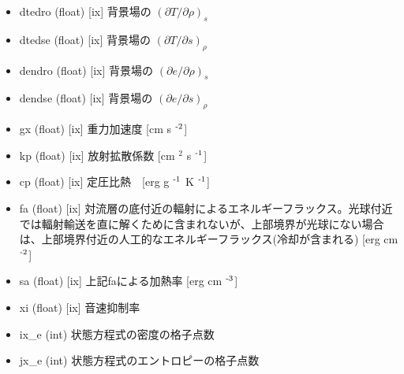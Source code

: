 \documentclass[letterpaper,10pt,dvipdfmx,report]{sphinxmanual}
\begin{document}
\begin{itemize}
\item {} 
\sphinxAtStartPar
dtedro (float) {[}ix{]} \sphinxhyphen{}\sphinxhyphen{} 背景場の \((\partial T/\partial \rho)_s\)

\item {} 
\sphinxAtStartPar
dtedse (float) {[}ix{]} \sphinxhyphen{}\sphinxhyphen{} 背景場の \((\partial T/\partial s)_\rho\)

\item {} 
\sphinxAtStartPar
dendro (float) {[}ix{]} \sphinxhyphen{}\sphinxhyphen{} 背景場の \((\partial e/\partial \rho)_s\)

\item {} 
\sphinxAtStartPar
dendse (float) {[}ix{]} \sphinxhyphen{}\sphinxhyphen{} 背景場の \((\partial e/\partial s)_\rho\)

\item {} 
\sphinxAtStartPar
gx (float) {[}ix{]} \sphinxhyphen{}\sphinxhyphen{} 重力加速度 {[}cm s $^{\text{\mbox{-}2}}${]}

\item {} 
\sphinxAtStartPar
kp (float) {[}ix{]} \sphinxhyphen{}\sphinxhyphen{} 放射拡散係数 {[}cm $^{\text{2}}$ s $^{\text{\mbox{-}1}}${]}

\item {} 
\sphinxAtStartPar
cp (float) {[}ix{]} \sphinxhyphen{}\sphinxhyphen{} 定圧比熱　{[}erg g $^{\text{\mbox{-}1}}$ K $^{\text{\mbox{-}1}}${]}

\item {} 
\sphinxAtStartPar
fa (float) {[}ix{]} \sphinxhyphen{}\sphinxhyphen{} 対流層の底付近の輻射によるエネルギーフラックス。光球付近では輻射輸送を直に解くために含まれないが、上部境界が光球にない場合は、上部境界付近の人工的なエネルギーフラックス(冷却が含まれる) {[}erg cm $^{\text{\mbox{-}2}}${]}

\item {} 
\sphinxAtStartPar
sa (float) {[}ix{]} \sphinxhyphen{}\sphinxhyphen{} 上記faによる加熱率 {[}erg cm $^{\text{\mbox{-}3}}${]}

\item {} 
\sphinxAtStartPar
xi (float) {[}ix{]} \sphinxhyphen{}\sphinxhyphen{} 音速抑制率

\item {} 
\sphinxAtStartPar
ix\_e (int) \sphinxhyphen{}\sphinxhyphen{} 状態方程式の密度の格子点数

\item {} 
\sphinxAtStartPar
jx\_e (int) \sphinxhyphen{}\sphinxhyphen{} 状態方程式のエントロピーの格子点数

\end{itemize}
\end{document}
